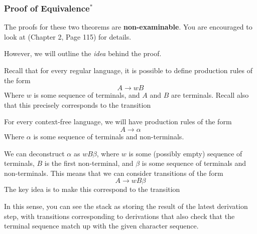 \subsubsection{Proof of Equivalence$^{*}$}
The proofs for these two theorems are \textbf{\textsf{non-examinable}}. You are encouraged to look at \citet{sipser-2006} (Chapter 2, Page 115) for details.

However, we will outline the \textit{idea} behind the proof. 

Recall that for every regular language, it is possible to define production rules of the form
\[A \rightarrow wB\]
Where $w$ is some sequence of terminals, and $A$ and $B$ are terminals. Recall also that this precisely corresponds to the transition
\begin{center}
\end{center}

For every context-free language, we will have production rules of the form
\[A \rightarrow \alpha\]
Where $\alpha$ is some sequence of terminals and non-terminals.

We can deconstruct $\alpha$ as $wB\beta$, where $w$ is some (possibly empty) sequence of terminals, $B$ is the first non-terminal, and $\beta$ is some sequence of terminals and non-terminals. This means that we can consider transitions of the form 
\[A \rightarrow wB\beta \]
The key idea is to make this correspond to the transition
\begin{center}
\end{center}

In this sense, you can see the stack as storing the result of the latest derivation step, with transitions corresponding to derivations that also check that the terminal sequence match up with the given character sequence.

